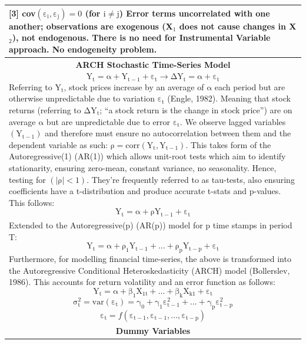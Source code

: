 \documentclass[11pt, english]{article}
\begin{document}
\begin{center}
\begin{longtable}{p{14cm}}
			[3] cov$\mathrm{(\varepsilon_i,\varepsilon_j)=0}$ (for $\mathrm{i\neq j}$)\newline\newline
			Error terms uncorrelated with one another; observations are exogenous (X$_1$ does not cause changes in X$_2$), not endogenous. There is no need for Instrumental Variable approach. No endogeneity problem.\\
			\hline
			\multicolumn{1}{c}{\textbf{ARCH Stochastic Time-Series Model}}\\
			\hline
			$$\mathrm{Y_t=\alpha+Y_{t-1}+\varepsilon_t\rightarrow\Delta Y_t=\alpha+\varepsilon_t}$$
                	Referring to $\mathrm{Y_t}$, stock prices increase by an average of $\mathrm{\alpha}$ each period but are otherwise unpredictable due to variation $\mathrm{\varepsilon_t}$ (Engle, 1982). Meaning that stock returns (referring to $\mathrm{\Delta Y_t}$; ``a stock return is the change in stock price”) are on average $\mathrm{\alpha}$ but are unpredictable due to error $\mathrm{\varepsilon_t}$.\newline\newline
			We observe lagged variables $\mathrm{(Y_{t-1})}$ and therefore must ensure no autocorrelation between them and the dependent variable as such: $\mathrm{\rho=corr\left(Y_t,Y_{t-1}\right)}$. This takes form of the Autoregressive(1) (AR(1)) which allows unit-root tests which aim to identify stationarity, ensuring zero-mean, constant variance, no seasonality. Hence, testing for $\mathrm{\left(|\rho|<1\right)}$. They’re frequently referred to as tau-tests, also ensuring coefficients have a t-distribution and produce accurate t-stats and p-values. This follows:
			$$\mathrm{Y_t=\alpha+\rho Y_{t-1}+\varepsilon_t}$$\\
			Extended to the Autoregressive(p) (AR(p)) model for p time stamps in period T:
			$$\mathrm{Y_t=\alpha+\rho_1Y_{t-1}+...+\rho_pY_{t-p}+\varepsilon_t}$$
			Furthermore, for modelling financial time-series, the above is transformed into the Autoregressive Conditional Heteroskedasticity (ARCH) model (Bollerslev, 1986). This accounts for return volatility and an error function as follows:
			$$\mathrm{Y_t=\alpha+\beta_1X_{1t}+...+\beta_kX_{k1}+\varepsilon_t}$$
			$$\mathrm{\sigma_t^2=var(\varepsilon_t)=\gamma_0+\gamma_1\varepsilon_{t-1}^2+...+\gamma_p\varepsilon_{t-p}^2}$$
			$$\mathrm{\varepsilon_t=\textit{f}\left(\varepsilon_{t-1},\varepsilon_{t-1},...,\varepsilon_{t-p}\right)}$$\\
			\hline
			\multicolumn{1}{c}{\textbf{Dummy Variables}}\\

\end{longtable}
\end{center}
\end{document}
